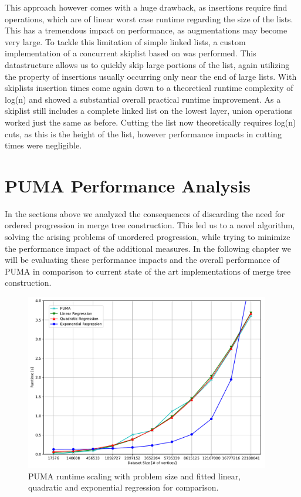 \documentclass[%
	paper=A4,					%
	twoside=true,				%
	openright,					%
	parskip=full,				%
	chapterprefix=true,			%
	11pt,						%
	headings=normal,			%
	bibliography=totoc,			%
	listof=totoc,				%
	titlepage=on,				%
	captions=tableabove,		%
	draft=false,				%
]{scrreprt}%
\begin{document}
This approach however comes with a huge drawback, as insertions require find operations, which are of linear worst case runtime regarding the size of the lists. This has a tremendous impact on performance, as augmentations may become very large. To tackle this limitation of simple linked lists, a custom implementation of a concurrent skiplist based on \cite{skiplist} was performed. This datastructure allows us to quickly skip large portions of the list, again utilizing the property of insertions usually occurring only near the end of large lists. With skiplists insertion times come again down to a theoretical runtime complexity of log(n) and showed a substantial overall practical runtime improvement. As a skiplist still includes a complete linked list on the lowest layer, union operations worked just the same as before. Cutting the list now theoretically requires log(n) cuts, as this is the height of the list, however performance impacts in cutting times were negligible.

\chapter{PUMA Performance Analysis}
In the sections above we analyzed the consequences of discarding the need for ordered progression in merge tree construction. This led us to a novel algorithm, solving the arising problems of unordered progression, while trying to minimize the performance impact of the additional measures. In the following chapter we will be evaluating these performance impacts and the overall performance of PUMA in comparison to current state of the art implementations of merge tree construction.
\begin{figure}[h]
\centering
\includegraphics[width=0.95\textwidth]{figures/datscale.pdf}
\caption{PUMA runtime scaling with problem size and fitted linear, quadratic and exponential regression for comparison.}
\label{fig:datscale}
\end{figure}
\end{document}
